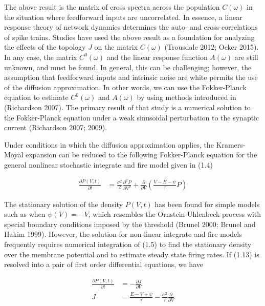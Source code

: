 \documentclass{ucetd}
\begin{document}
The above result is the matrix of cross spectra across the population $C(\omega)$ in the situation where feedforward inputs are uncorrelated.
In essence, a linear response theory of network dynamics determines the auto- and cross-correlations of spike trains. Studies have used the above result as a foundation for analyzing the effects of the topology $J$ on the matrix $C(\omega)$ (Trousdale 2012; Ocker 2015). In any case, the matrix $C^{0}(\omega)$ and the linear response function $A(\omega)$ are still unknown, and must be found. In general, this can be challenging; however, the assumption that feedforward inputs and intrinsic noise are white permits the use of the diffusion approximation. In other words, we can use the Fokker-Planck equation to estimate $C^{0}(\omega)$ and $A(\omega)$ by using methods introduced in (Richardson 2007). The primary result of that study is a numerical solution to the Fokker-Planck equation under a weak sinusoidal perturbation to the synaptic current (Richardson 2007; 2009). 

Under conditions in which the diffusion approximation applies, the Kramers-Moyal expansion can be reduced to the following Fokker-Planck equation for the general nonlinear stochastic integrate and fire model given in (1.4)

\begin{align}
\frac{\partial P(V,t)}{\partial t} &= \frac{\sigma^{2}}{2}\frac{\partial^{2}P}{\partial V^{2}} + \frac{\partial}{\partial V}\left(\frac{V-E-\psi}{\tau}P\right)
\end{align}

The stationary solution of the density $P(V,t)$ has been found for simple models such as when $\psi(V) = -V$, which resembles the Ornstein-Uhlenbeck process with special boundary conditions imposed by the threshold (Brunel 2000; Brunel and Hakim 1999). However, the solution for non-linear integrate and fire models frequently requires numerical integration of (1.5) to find the stationary density over the membrane potential and to estimate steady state firing rates. If (1.13) is resolved into a pair of first order differential equations, we have

\begin{align*}
\frac{\partial P(V,t)}{\partial t} &= -\frac{\partial J}{\partial V}\\
J &= \frac{E-V+\psi}{\tau} - \frac{\sigma^{2}}{\tau}\frac{\partial}{\partial V}
\end{align*}
\end{document}

